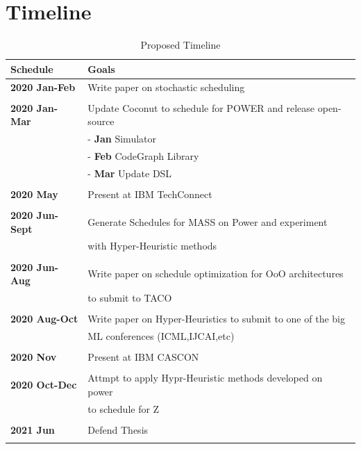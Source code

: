 \documentclass[12pt]{report}
\begin{document}
\chapter{Timeline}
\label{sec:orgbb43c1b}

\begin{table}[htbp]
\caption{\label{tab:ProposedTimeline}Proposed Timeline}
\centering
\begin{tabular}{ll}
\textbf{Schedule} & \textbf{Goals}\\
\hline
\textbf{2020 Jan-Feb} & Write paper on stochastic scheduling\\
 & \\
\hline
\textbf{2020 Jan-Mar} & Update Coconut to schedule for POWER and release open-source\\
 & - \textbf{Jan} Simulator\\
 & - \textbf{Feb} CodeGraph Library\\
 & - \textbf{Mar} Update DSL\\
 & \\
\hline
\textbf{2020 May} & Present at IBM TechConnect\\
 & \\
\hline
\textbf{2020 Jun-Sept} & Generate Schedules for MASS on Power and experiment\\
 & with Hyper-Heuristic methods\\
 & \\
\hline
\textbf{2020 Jun-Aug} & Write paper on schedule optimization for OoO architectures\\
 & to submit to TACO\\
 & \\
\hline
\textbf{2020 Aug-Oct} & Write paper on Hyper-Heuristics to submit to one of the big\\
 & ML conferences (ICML,IJCAI,etc)\\
 & \\
\hline
\textbf{2020 Nov} & Present at IBM CASCON\\
 & \\
\hline
\textbf{2020 Oct-Dec} & Attmpt to apply Hypr-Heuristic methods developed on power\\
 & to schedule for Z\\
 & \\
\hline
\textbf{2021 Jun} & Defend Thesis\\
 & \\
\hline
\end{tabular}
\end{table}

\printbibliography
\end{document}
